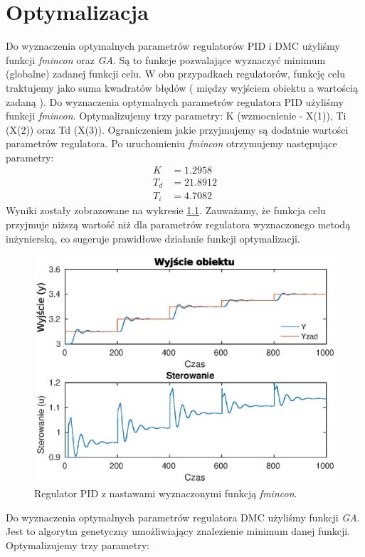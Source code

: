 \chapter{Optymalizacja}
Do wyznaczenia optymalnych parametrów regulatorów PID i DMC użyliśmy funkcji \emph{fmincon} oraz \emph{GA}. Są to funkcje pozwalające wyznaczyć minimum (globalne) zadanej funkcji celu.
W obu przypadkach regulatorów, funkcję celu traktujemy jako suma kwadratów błędów ( między wyjściem obiektu a wartością zadaną ).
Do wyznaczenia optymalnych parametrów regulatora PID użyliśmy funkcji \emph{fmincon}. Optymalizujemy trzy parametry: K (wzmocnienie - X(1)), Ti (X(2)) oraz Td (X(3)).
Ograniczeniem jakie przyjmujemy są dodatnie wartości parametrów regulatora. Po uruchomieniu \emph{fmincon} otrzymujemy następujące parametry:
\begin{align}
  K &= 1.2958 \nonumber \\
  T_d &= 21.8912 \\
  T_i &= 4.7082 \nonumber
\end{align}
Wyniki zostały zobrazowane na wykresie \ref{fig:optim_pid}.
Zauważamy, że funkcja celu przyjmuje niższą wartość niż dla parametrów regulatora wyznaczonego metodą inżynierską, co sugeruje prawidłowe działanie funkcji optymalizacji.
\begin{figure}
  \includegraphics{wykresy/optim_pid.eps}
  \caption{Regulator PID z nastawami wyznaczonymi funkcją \emph{fmincon}.}
  \label{fig:optim_pid}
\end{figure}
Do wyznaczenia optymalnych parametrów regulatora DMC użyliśmy funkcji \emph{GA}. Jest to algorytm genetyczny umożliwiający znalezienie minimum danej funkcji. Optymalizujemy trzy parametry:
